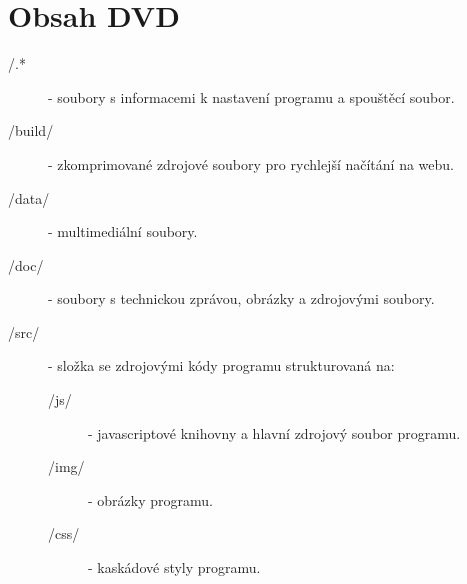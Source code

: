 






\chapter{Obsah DVD} %

\begin{description}
	\item[/.*] - soubory s informacemi k nastavení programu a spouštěcí soubor.
	\item[/build/] - zkomprimované zdrojové soubory pro rychlejší načítání na webu.	
	\item[/data/] - multimediální soubory.	
	\item[/doc/] - soubory s technickou zprávou, obrázky a zdrojovými soubory.	
	\item[/src/] - složka se zdrojovými kódy programu strukturovaná na:	
		\begin{description}
			\item[/js/] - javascriptové knihovny a hlavní zdrojový soubor programu.
			\item[/img/] - obrázky programu.
			\item[/css/] - kaskádové styly programu.
		\end{description}
\end{description}

